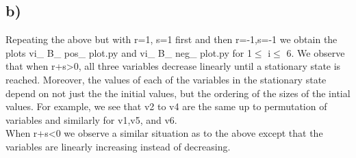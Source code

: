 \documentclass[11pt]{article}
\begin{document}
\subsection{b)}
\label{sec:org0828440}

Repeating the above but with r=1, s=1 first and then r=-1,s=-1 we obtain the plots vi\_ B\_ pos\_ plot.py and vi\_ B\_ neg\_ plot.py  for 1\(\le\) i\(\le\) 6.
We observe that when r+s>0, all three variables decrease linearly until a stationary state is reached. Moreover, the values of each of the variables
in the stationary state depend on not just the the initial values, but the ordering of the sizes of the intial values. For example, we see that v2 to v4
are the same up to permutation of variables and similarly for v1,v5, and v6. \\
When r+s<0 we observe a similar situation as to the above except that the variables are linearly increasing instead of decreasing.
\end{document}
